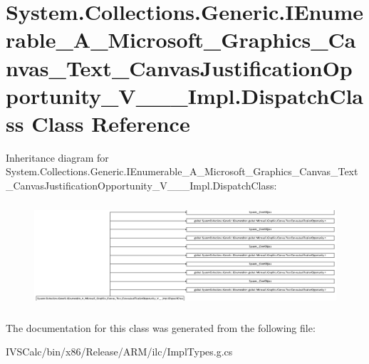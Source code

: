 \hypertarget{class_system_1_1_collections_1_1_generic_1_1_i_enumerable___a___microsoft___graphics___canvas___50a8701bae49280600359a555e4ebb43}{}\section{System.\+Collections.\+Generic.\+I\+Enumerable\+\_\+\+A\+\_\+\+Microsoft\+\_\+\+Graphics\+\_\+\+Canvas\+\_\+\+Text\+\_\+\+Canvas\+Justification\+Opportunity\+\_\+\+V\+\_\+\+\_\+\+\_\+\+Impl.\+Dispatch\+Class Class Reference}
\label{class_system_1_1_collections_1_1_generic_1_1_i_enumerable___a___microsoft___graphics___canvas___50a8701bae49280600359a555e4ebb43}
Inheritance diagram for System.\+Collections.\+Generic.\+I\+Enumerable\+\_\+\+A\+\_\+\+Microsoft\+\_\+\+Graphics\+\_\+\+Canvas\+\_\+\+Text\+\_\+\+Canvas\+Justification\+Opportunity\+\_\+\+V\+\_\+\+\_\+\+\_\+\+Impl.\+Dispatch\+Class\+:\begin{figure}[H]
\begin{center}
\leavevmode
\includegraphics[height=3.903676cm]{class_system_1_1_collections_1_1_generic_1_1_i_enumerable___a___microsoft___graphics___canvas___50a8701bae49280600359a555e4ebb43}
\end{center}
\end{figure}


The documentation for this class was generated from the following file\+:\begin{DoxyCompactItemize}
\item 
I\+V\+S\+Calc/bin/x86/\+Release/\+A\+R\+M/ilc/Impl\+Types.\+g.\+cs\end{DoxyCompactItemize}
